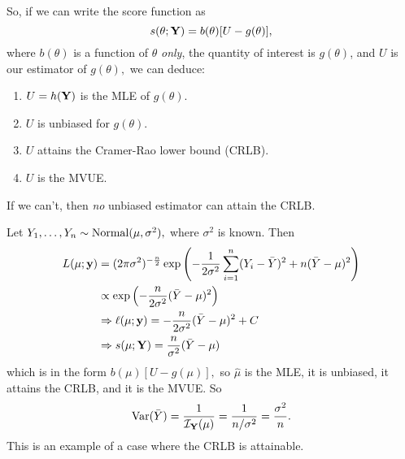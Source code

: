 So, if we can write the score function as
$$
s(\theta;\mathbf Y)=b(\theta)[U-g(\theta)],
$$
where $b(\theta)$ is a function of $\theta$ \textit{only}, the quantity of interest is $g(\theta)$, and $U$ is our estimator of $g(\theta),$ we can deduce:
\begin{enumerate}[(1)]
    \item $U=h(\mathbf Y)$ is the MLE of $g(\theta)$.
    \item $U$ is unbiased for $g(\theta).$
    \item $U$ attains the Cramer-Rao lower bound (CRLB).
    \item $U$ is the MVUE.
\end{enumerate}
If we can't, then \textit{no} unbiased estimator can attain the CRLB.

\begin{eg}
Let $Y_1,\ldots,Y_n\sim \operatorname*{Normal}(\mu,\sigma^2),$ where $\sigma^2$ is known. Then
\begin{align*}
    L(\mu;\mathbf y)&=(2\pi\sigma^2)^{-\frac{n}{2}}\exp\left(-\frac{1}{2\sigma^2}\sum^n_{i=1}(Y_i-\bar Y)^2+n(\bar Y-\mu)^2\right)\\
    &\propto \exp\left(-\frac{n}{2\sigma^2}(\bar Y-\mu)^2\right) \\
    &\Rightarrow \ell(\mu;\mathbf y)=-\frac{n}{2\sigma^2}(\bar Y-\mu)^2 +C \\
    &\Rightarrow s(\mu;\mathbf Y)=\frac{n}{\sigma^2}(\bar Y-\mu) 
\end{align*}
which is in the form $b(\mu)[U-g(\mu)],$ so $\hat \mu$ is the MLE, it is unbiased, it attains the CRLB, and it is the MVUE. So
$$
\operatorname*{Var}(\bar Y)=\frac{1}{\mathcal I_\mathbf Y(\mu)}=\frac{1}{n/\sigma^2}=\frac{\sigma^2}{n}.
$$
This is an example of a case where the CRLB is attainable.
\end{eg}
